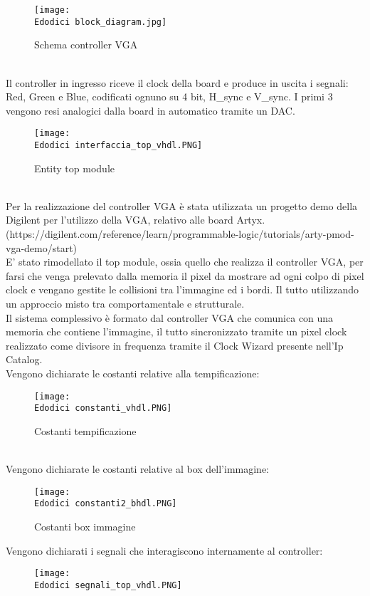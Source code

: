 \documentclass[12pt]{article}
\def \Edodici {Allegati/Esercizio12/}
\begin{document}
{\begin{figure}[ht]
    \centering
    \texttt{[image: \\Edodici block\_diagram.jpg]}
    \caption{Schema controller VGA}
\end{figure}
\\Il controller in ingresso riceve il clock della board e produce in uscita i segnali: Red, Green e Blue, codificati ognuno su 4 bit, H\_sync e V\_sync. I primi 3 vengono resi analogici dalla board in automatico tramite un DAC.
\begin{figure}[ht!]
    \texttt{[image: \\Edodici interfaccia\_top\_vhdl.PNG]}
    \caption{Entity top module}
\end{figure}
\\Per la realizzazione del controller VGA è stata utilizzata un progetto demo della Digilent per l’utilizzo della VGA, relativo alle board Artyx. (https://digilent.com/reference/learn/programmable-logic/tutorials/arty-pmod-vga-demo/start)
\\E’ stato rimodellato il top module, ossia quello che realizza il controller VGA, per farsi che venga prelevato dalla memoria il pixel da mostrare ad ogni colpo di pixel clock e vengano gestite le collisioni tra l’immagine ed i bordi. Il tutto utilizzando un approccio misto tra comportamentale e strutturale. 
\\Il sistema complessivo è formato dal controller VGA che comunica con una memoria che contiene l’immagine, il tutto sincronizzato tramite un pixel clock realizzato come divisore in frequenza tramite il Clock Wizard presente nell’Ip Catalog.
\\Vengono dichiarate le costanti relative alla tempificazione:
\begin{figure}[ht!]
    \texttt{[image: \\Edodici constanti\_vhdl.PNG]}
    \caption{Costanti tempificazione}
\end{figure}
\\Vengono dichiarate le costanti relative al box dell’immagine:
\begin{figure}[ht!]
    \texttt{[image: \\Edodici constanti2\_bhdl.PNG]}
    \caption{Costanti box immagine}
\end{figure}
\newpage
Vengono dichiarati i segnali che interagiscono internamente al controller:
\begin{figure}[ht]
    \texttt{[image: \\Edodici segnali\_top\_vhdl.PNG]}

\end{figure}}
\end{document}
